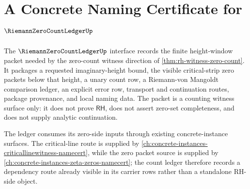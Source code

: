 \chapter{A Concrete Naming Certificate for $\RiemannZeroCountLedgerUp$}
\label{ch:concrete-instances-riemann-zero-count-ledger-namecert}

The $\RiemannZeroCountLedgerUp$ interface records the finite height-window packet needed by the zero-count witness direction of \autoref{thm:rh-witness-zero-count}. It packages a requested imaginary-height bound, the visible critical-strip zero packets below that height, a unary count row, a Riemann-von Mangoldt comparison ledger, an explicit error row, transport and continuation routes, package provenance, and local naming data. The packet is a counting witness surface only: it does not prove $\mathsf{RH}$, does not assert zero-set completeness, and does not supply analytic continuation.

The ledger consumes its zero-side inputs through existing concrete-instance surfaces. The critical-line route is supplied by \autoref{ch:concrete-instances-criticallinewitness-namecert}, while the zero packet source is supplied by \autoref{ch:concrete-instances-zeta-zeros-namecert}; the count ledger therefore records a dependency route already visible in its carrier rows rather than a standalone RH-side object.

